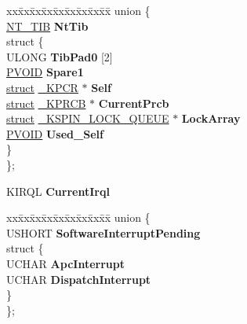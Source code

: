 \begin{DoxyCompactItemize}
\mbox{\label{struct___k_i_p_c_r_aab17722617cce58bb9f6766501a012c1}} 
\begin{tabbing}
xx\=xx\=xx\=xx\=xx\=xx\=xx\=xx\=xx\=\kill
union \{\\
\>\hyperlink{struct___n_t___t_i_b}{NT\_TIB} {\bfseries NtTib}\\
\mbox{\label{union___k_i_p_c_r_1_1_0D1960_aa69dd871ddda11da05459b48d52ef135}} 
\>struct \{\\
\>\>ULONG {\bfseries TibPad0} \mbox{[}2\mbox{]}\\
\>\>\hyperlink{interfacevoid}{PVOID} {\bfseries Spare1}\\
\>\>\hyperlink{interfacestruct}{struct} \hyperlink{struct___k_p_c_r}{\_KPCR} $\ast$ {\bfseries Self}\\
\>\>\hyperlink{interfacestruct}{struct} \hyperlink{struct___k_p_r_c_b}{\_KPRCB} $\ast$ {\bfseries CurrentPrcb}\\
\>\>\hyperlink{interfacestruct}{struct} \hyperlink{struct___k_s_p_i_n___l_o_c_k___q_u_e_u_e}{\_KSPIN\_LOCK\_QUEUE} $\ast$ {\bfseries LockArray}\\
\>\>\hyperlink{interfacevoid}{PVOID} {\bfseries Used\_Self}\\
\>\} \\
\}; \\

\end{tabbing}\item 
\mbox{\label{struct___k_i_p_c_r_a5566572c779e41a88ec514e4b29e75c5}} 
K\+I\+R\+QL {\bfseries Current\+Irql}
\item 
\mbox{\label{struct___k_i_p_c_r_abc18829ccda602f27d63104d5345ab55}} 
\begin{tabbing}
xx\=xx\=xx\=xx\=xx\=xx\=xx\=xx\=xx\=\kill
union \{\\
\>USHORT {\bfseries SoftwareInterruptPending}\\
\mbox{\label{union___k_i_p_c_r_1_1_0D1962_a7af7767989d6b9cece7f97af2e134df8}} 
\>struct \{\\
\>\>UCHAR {\bfseries ApcInterrupt}\\
\>\>UCHAR {\bfseries DispatchInterrupt}\\
\>\} \\
\}; \\


\end{tabbing}
\end{DoxyCompactItemize}
